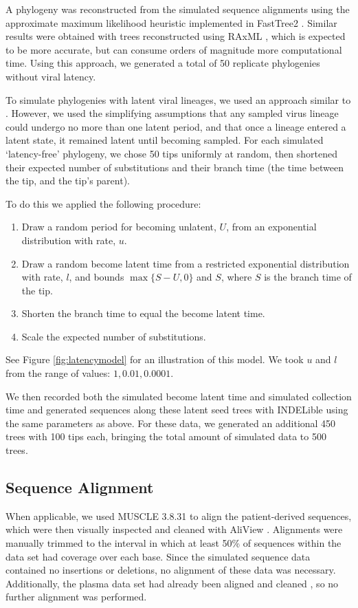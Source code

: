 \documentclass[12pt]{article}
\begin{document}
A phylogeny was reconstructed from the simulated sequence alignments using the approximate maximum likelihood heuristic implemented in FastTree2 \citep{FastTree10}.
Similar results were obtained with trees reconstructed using RAxML \citep{Raxml14}, which is expected to be more accurate, but can consume orders of magnitude more computational time.
Using this approach, we generated a total of 50 replicate phylogenies without viral latency. 

To simulate phylogenies with latent viral lineages, we used an approach similar to  \citet{Immonen14}. 
However, we used the simplifying assumptions that any sampled virus lineage could undergo no more than one latent period, and that once a lineage entered a latent state, it remained latent until becoming sampled.
For each simulated `latency-free' phylogeny, we chose 50 tips uniformly at random, then shortened their expected number of substitutions and their branch time (the time between the tip, and the tip's parent).

To do this we applied the following procedure:
\begin{enumerate}
\item Draw a random period for becoming unlatent, $U$, from an exponential distribution with rate, $u$.
\item Draw a random become latent time from a restricted exponential distribution with rate, $l$, and bounds $\max\{S-U, 0\}$ and $S$, where $S$ is the branch time of the tip.
\item Shorten the branch time to equal the become latent time.
\item Scale the expected number of substitutions.
\end{enumerate}
See Figure \ref{fig:latencymodel} for an illustration of this model. We took $u$ and $l$ from the range of values: $1, 0.01, 0.0001$.

We then recorded both the simulated become latent time and simulated collection time and generated sequences along these latent seed trees with INDELible using the same parameters as above. 
For these data, we generated an additional 450 trees with 100 tips each, bringing the total amount of simulated data to 500 trees.


\subsection * {Sequence Alignment} \label{subsec:seqalign}
When applicable, we used MUSCLE 3.8.31 \citep{Muscle04} to align the patient-derived sequences, which were then visually inspected and cleaned with AliView \citep{AliView14}. 
Alignments were manually trimmed to the interval in which at least  50\% of sequences within the data set had coverage over each base.
Since the simulated sequence data contained no insertions or deletions, no alignment of these data was necessary. 
Additionally, the plasma data set had already been aligned and cleaned \citep{McCloskey14}, so no further alignment was performed.
\end{document}
